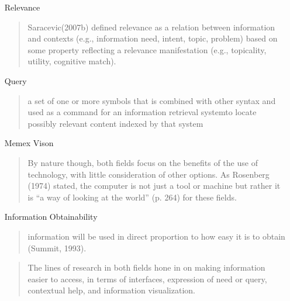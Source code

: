 \documentclass{article}
\begin{document}
\begin{itemize}
    \item[Relevance]
        \begin{quote}
            Saracevic(2007b) defined relevance as a relation between information and contexts (e.g., information need, intent, topic, problem) based on some property reflecting a relevance manifestation (e.g., topicality, utility, cognitive match).
        \end{quote}

    \item[Query]
        \begin{quote}
            a set of one or more symbols that is combined with other syntax and used as a command for an information retrieval systemto locate possibly relevant content indexed by that system
        \end{quote}

    \item[Memex Vison]
        \begin{quote}
             By nature though, both fields focus on the benefits of the use of technology, with little consideration of other options. As Rosenberg (1974) stated, the computer is not just a tool or machine but rather it is “a way of looking at the world” (p. 264) for these fields.
        \end{quote}

    \item[Information Obtainability]
        \begin{quote}
            information will be  used  in  direct  proportion  to  how  easy  it  is  to  obtain (Summit, 1993).
        \end{quote}

        \begin{quote}
            The lines of research in both fields hone in on making information easier to access, in terms of interfaces, expression of need or query, contextual help, and information visualization.
        \end{quote}


\end{itemize}

\end{document}
